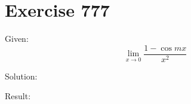 \documentclass[a4paper, 10pt]{scrartcl}
\begin{document}
\section{Exercise 777}

Given:
\[
\lim_{x\to 0}{\frac{1 - \cos{mx}}{x^{2}}}
\]

Solution:

Result:
\end{document}
